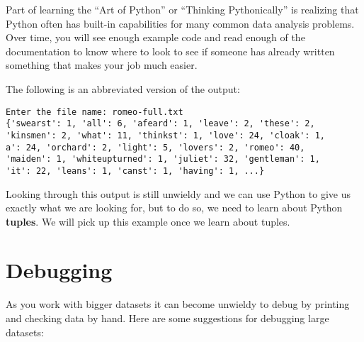 %
Part of learning the ``Art of Python'' or ``Thinking Pythonically''
is realizing that Python
often has built-in capabilities for many common data analysis
problems.  Over time, you will see enough example code and read
enough of the documentation to know where to look to see if someone
has already written something that makes your job much easier.

The following is an abbreviated version of the output:

\beforeverb
\begin{verbatim}
Enter the file name: romeo-full.txt
{'swearst': 1, 'all': 6, 'afeard': 1, 'leave': 2, 'these': 2, 
'kinsmen': 2, 'what': 11, 'thinkst': 1, 'love': 24, 'cloak': 1, 
a': 24, 'orchard': 2, 'light': 5, 'lovers': 2, 'romeo': 40, 
'maiden': 1, 'whiteupturned': 1, 'juliet': 32, 'gentleman': 1, 
'it': 22, 'leans': 1, 'canst': 1, 'having': 1, ...}
\end{verbatim}
\afterverb
%
Looking through this output is still unwieldy and we can use
Python to give us exactly what we are looking for, but to do 
so, we need to learn about Python {\bf tuples}.  We
will pick up this example once we learn about tuples.

\section{Debugging}

As you work with bigger datasets it can become unwieldy to
debug by printing and checking data by hand.  Here are some
suggestions for debugging large datasets:

